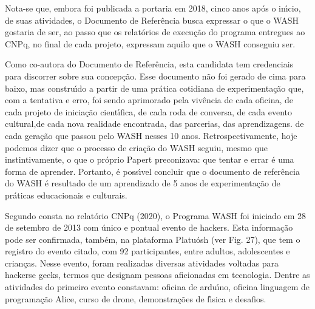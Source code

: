 \documentclass[
12pt,		%
openright,	%
twoside,  %
a4paper,			%
chapter=TITLE,		%
english,			%
french,				%
spanish,			%
brazil				%
]{USPSC-classe/USPSC}
\begin{document}
Nota-se que, embora foi publicada a portaria em 2018, cinco anos ap\'os o in\'{\i}cio, de suas atividades, o Documento de Refer\^encia busca expressar \textquotedbl o que o WASH gostaria de ser\textquotedbl , ao passo que os relat\'orios de execu\c{c}\~ao do programa entregues ao CNPq, no final de cada projeto, expressam \textquotedbl aquilo que o WASH conseguiu ser\textquotedbl .








Como co-autora do Documento de Refer\^encia, esta candidata tem credenciais para discorrer sobre sua concep\c{c}\~ao. Esse documento n\~ao foi gerado de cima para baixo, mas constru\'{\i}do a partir de uma pr\'atica cotidiana de experimenta\c{c}\~ao que, com a \textquotedbl tentativa e erro\textquotedbl , foi sendo aprimorado pela viv\^encia de cada oficina, de cada projeto de inicia\c{c}\~ao cient\'{\i}fica, de cada roda de conversa, de cada  evento cultural,de cada nova realidade encontrada, das parcerias, das aprendizagens. de cada gera\c{c}\~ao que passou pelo WASH nesses 10 anos. Retrospectivamente, hoje podemos dizer que o processo de cria\c{c}\~ao do WASH seguiu, mesmo que instintivamente, o que o pr\'oprio Papert preconizava: que tentar e errar \'e uma forma de aprender. Portanto, \'e poss\'{\i}vel concluir que o documento de refer\^encia do WASH \'e resultado de um aprendizado de 5 anos de experimenta\c{c}\~ao de pr\'aticas educacionais e culturais.








Segundo  consta no relat\'orio CNPq (2020), o Programa WASH foi iniciado em 28 de setembro de 2013 com \textquotedbl \'unico e pontual evento de hackers\textquotedbl . Esta informa\c{c}\~ao pode ser confirmada, tamb\'em, na plataforma Platu\'osh (ver Fig. 27), que tem o registro do evento citado, com 92 participantes, entre adultos, adolescentes e crian\c{c}as. Nesse evento, foram realizadas diversas atividades voltadas para \textquotedbl hackers\textquotedbl  e \textquotedbl geeks\textquotedbl , termos que designam pessoas aficionadas em tecnologia. Dentre as atividades do primeiro evento constavam: oficina de ardu\'{\i}no, oficina linguagem de programa\c{c}\~ao Alice, curso de drone, demonstra\c{c}\~oes de f\'{\i}sica e desafios.
\end{document}

